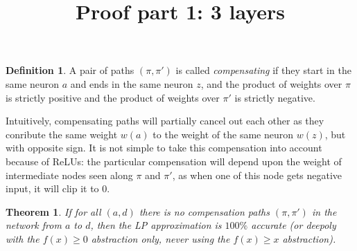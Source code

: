 \documentclass[]{article}
\title{Proof part 1: 3 layers}
\date{}
\newtheorem{theorem}{Theorem}
\theoremstyle{definition}
\newtheorem{definition}{Definition}
\begin{document}
\maketitle

\begin{definition}
	A pair of paths $(\pi,\pi')$
	is called {\em compensating} if they start in the same neuron $a$ and ends in the same neuron $z$, and the product of weights over $\pi$ is strictly positive and the product of weights over $\pi'$ is strictly negative.
\end{definition}

Intuitively, compensating paths will partially cancel out each other as they conribute the same weight $w(a)$ to the weight of the same neuron $w(z)$, but with opposite sign. 
It is not simple to take this compensation into account because of ReLUs: the particular compensation will depend upon the weight of intermediate nodes seen along $\pi$ and $\pi'$, 
as when one of this node gets negative input, it will clip it to 0.


\begin{theorem}
	If for all $(a,d)$ there is no compensation paths $(\pi,\pi')$ 
	in the network from $a$ to $d$, then the LP approximation is 
	$100\%$ accurate (or deepoly with the $f(x) \geq 0$ abstraction only, never using the 
	$f(x) \geq x$ abstraction). 
\end{theorem}
\end{document}
